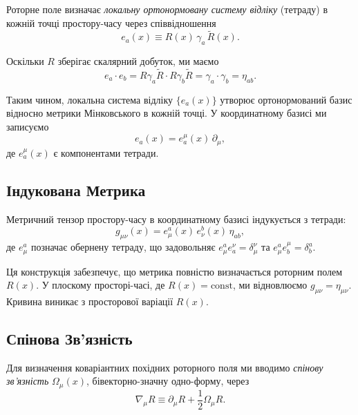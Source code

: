 \documentclass[11pt,a4paper]{article}
\numberwithin{equation}{section}
\theoremstyle{plain}
\theoremstyle{definition}
\theoremstyle{remark}
\begin{document}
Роторне поле визначає \emph{локальну ортонормовану систему відліку} (тетраду) в кожній точці простору-часу через співвідношення
\begin{equation}
e_a(x) \equiv R(x)\, \gamma_a\, \widetilde{R}(x).
\label{eq:tetrad-def}
\end{equation}

Оскільки $R$ зберігає скалярний добуток, ми маємо
\begin{equation}
e_a \cdot e_b = R\gamma_a\widetilde{R} \cdot R\gamma_b\widetilde{R} = \gamma_a \cdot \gamma_b = \eta_{ab}.
\end{equation}

Таким чином, локальна система відліку $\{e_a(x)\}$ утворює ортонормований базис відносно метрики Мінковського в кожній точці. У координатному базисі ми записуємо
\begin{equation}
e_a(x) = e_a^\mu(x)\, \partial_\mu,
\end{equation}
де $e_a^\mu(x)$ є компонентами тетради.

\subsection{Індукована Метрика}

Метричний тензор простору-часу в координатному базисі індукується з тетради:
\begin{equation}
g_{\mu\nu}(x) = e_\mu^a(x)\, e_\nu^b(x)\, \eta_{ab},
\label{eq:metric-def}
\end{equation}
де $e_\mu^a$ позначає обернену тетраду, що задовольняє $e_\mu^a e_a^\nu = \delta_\mu^\nu$ та $e_\mu^a e_b^\mu = \delta_b^a$.

Ця конструкція забезпечує, що метрика повністю визначається роторним полем $R(x)$. У плоскому просторі-часі, де $R(x) = \mathrm{const}$, ми відновлюємо $g_{\mu\nu} = \eta_{\mu\nu}$. Кривина виникає з просторової варіації $R(x)$.

\subsection{Спінова Зв'язність}

Для визначення коваріантних похідних роторного поля ми вводимо \emph{спінову зв'язність} $\Omega_\mu(x)$, бівекторно-значну одно-форму, через
\begin{equation}
\nabla_\mu R \equiv \partial_\mu R + \frac{1}{2}\Omega_\mu R.
\label{eq:spin-connection}
\end{equation}
\end{document}
